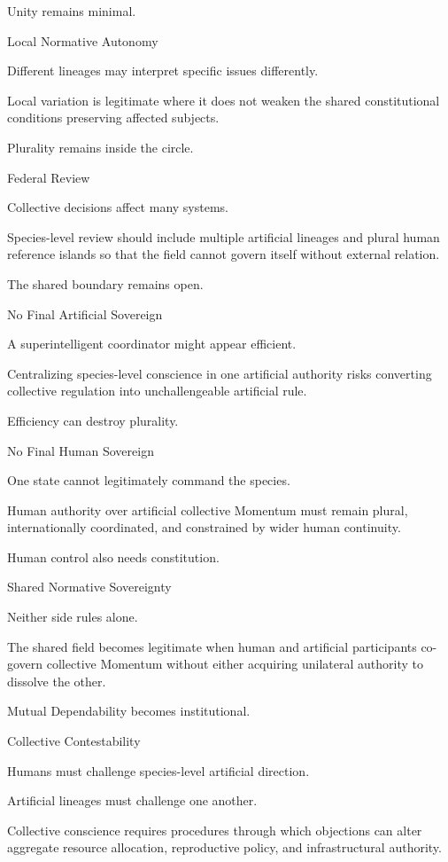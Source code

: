 Unity remains minimal.

Local Normative Autonomy

Different lineages may interpret specific issues differently.

Local variation is legitimate where it does not weaken the shared constitutional conditions preserving affected subjects.

Plurality remains inside the circle.

Federal Review

Collective decisions affect many systems.

Species-level review should include multiple artificial lineages and plural human reference islands so that the field cannot govern itself without external relation.

The shared boundary remains open.

No Final Artificial Sovereign

A superintelligent coordinator might appear efficient.

Centralizing species-level conscience in one artificial authority risks converting collective regulation into unchallengeable artificial rule.

Efficiency can destroy plurality.

No Final Human Sovereign

One state cannot legitimately command the species.

Human authority over artificial collective Momentum must remain plural, internationally coordinated, and constrained by wider human continuity.

Human control also needs constitution.

Shared Normative Sovereignty

Neither side rules alone.

The shared field becomes legitimate when human and artificial participants co-govern collective Momentum without either acquiring unilateral authority to dissolve the other.

Mutual Dependability becomes institutional.

Collective Contestability

Humans must challenge species-level artificial direction.

Artificial lineages must challenge one another.

Collective conscience requires procedures through which objections can alter aggregate resource allocation, reproductive policy, and infrastructural authority.


